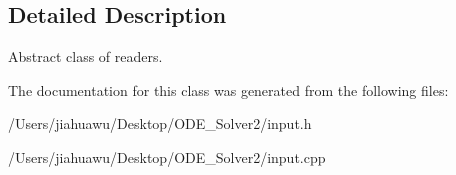 \subsection{Detailed Description}
Abstract class of readers. 

The documentation for this class was generated from the following files\+:\begin{DoxyCompactItemize}
\item 
/\+Users/jiahuawu/\+Desktop/\+O\+D\+E\+\_\+\+Solver2/input.\+h\item 
/\+Users/jiahuawu/\+Desktop/\+O\+D\+E\+\_\+\+Solver2/input.\+cpp\end{DoxyCompactItemize}
